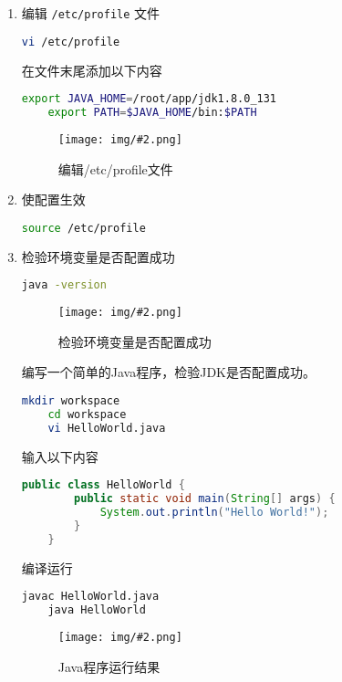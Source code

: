 \documentclass{article}
\newenvironment{enum}{
    \begin{enumerate}[label=(\arabic*), noitemsep]
}{
    \end{enumerate}
}
\newcommand{\img}[3][0.9]{%
    \begin{figure}[H]
        \centering
        \texttt{[image: img/\#2.png]}
        \caption{#3}
    \end{figure}
}
\begin{document}
\begin{enum}
    \item 编辑 \texttt{/etc/profile} 文件
    
    \begin{lstlisting}[language=bash]
    vi /etc/profile
    \end{lstlisting}

    在文件末尾添加以下内容 

    \begin{lstlisting}[language=bash]
    export JAVA_HOME=/root/app/jdk1.8.0_131
    export PATH=$JAVA_HOME/bin:$PATH
    \end{lstlisting}

    \img[0.75]{2.2.1}{编辑/etc/profile文件}

    \item 使配置生效
    
    \begin{lstlisting}[language=bash]
    source /etc/profile
    \end{lstlisting}

    \item 检验环境变量是否配置成功
    
    \begin{lstlisting}[language=bash]
    java -version
    \end{lstlisting}

    \img{2.2.2}{检验环境变量是否配置成功}

    编写一个简单的Java程序，检验JDK是否配置成功。

    \begin{lstlisting}[language=bash]
    mkdir workspace
    cd workspace
    vi HelloWorld.java
    \end{lstlisting}

    输入以下内容

    \begin{lstlisting}[language=java]
    public class HelloWorld {
        public static void main(String[] args) {
            System.out.println("Hello World!");
        }
    }
    \end{lstlisting}

    编译运行

    \begin{lstlisting}[language=bash]
    javac HelloWorld.java
    java HelloWorld
    \end{lstlisting}

    \img{2.2.3}{Java程序运行结果}
\end{enum}
\end{document}

